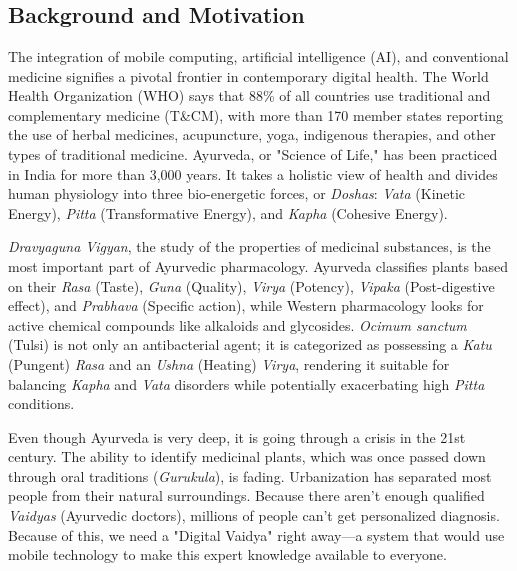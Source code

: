 \documentclass[12pt, a4paper]{report}
\begin{document}
\chapter[Introduction]{}
\titleformat{\chapter}[display]{\vspace{1cm}\normalfont\Large\bfseries\centering}{\chaptertitlename\ \thechapter}{20pt}{\vspace{0pt}}
\titlespacing*{\chapter}{0pt}{-50pt}{20pt}

\section{Background and Motivation} 
\justify
The integration of mobile computing, artificial intelligence (AI), and conventional medicine signifies a pivotal frontier in contemporary digital health. The World Health Organization (WHO) says that 88\% of all countries use traditional and complementary medicine (T\&CM), with more than 170 member states reporting the use of herbal medicines, acupuncture, yoga, indigenous therapies, and other types of traditional medicine. Ayurveda, or "Science of Life," has been practiced in India for more than 3,000 years. It takes a holistic view of health and divides human physiology into three bio-energetic forces, or \textit{Doshas}: \textit{Vata} (Kinetic Energy), \textit{Pitta} (Transformative Energy), and \textit{Kapha} (Cohesive Energy).

\textit{Dravyaguna Vigyan}, the study of the properties of medicinal substances, is the most important part of Ayurvedic pharmacology. Ayurveda classifies plants based on their \textit{Rasa} (Taste), \textit{Guna} (Quality), \textit{Virya} (Potency), \textit{Vipaka} (Post-digestive effect), and \textit{Prabhava} (Specific action), while Western pharmacology looks for active chemical compounds like alkaloids and glycosides. \textit{Ocimum sanctum} (Tulsi) is not only an antibacterial agent; it is categorized as possessing a \textit{Katu} (Pungent) \textit{Rasa} and an \textit{Ushna} (Heating) \textit{Virya}, rendering it suitable for balancing \textit{Kapha} and \textit{Vata} disorders while potentially exacerbating high \textit{Pitta} conditions.

Even though Ayurveda is very deep, it is going through a crisis in the 21st century. The ability to identify medicinal plants, which was once passed down through oral traditions (\textit{Gurukula}), is fading. Urbanization has separated most people from their natural surroundings. Because there aren't enough qualified \textit{Vaidyas} (Ayurvedic doctors), millions of people can't get personalized diagnosis. Because of this, we need a "Digital Vaidya" right away---a system that would use mobile technology to make this expert knowledge available to everyone.
\end{document}
